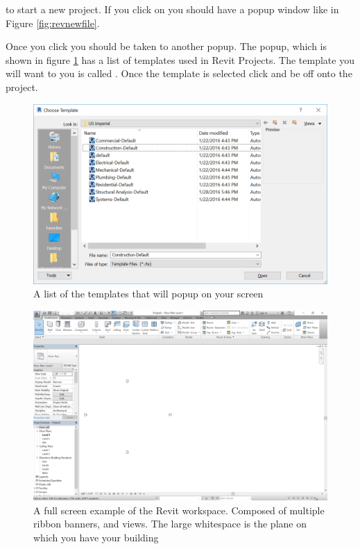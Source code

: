 \documentclass{tufte-book} %
\begin{document}
 to start a new project. If you click on  you should have a popup window like in Figure \ref{fig:revnewfile}. 

Once you click  you should be taken to another popup. The popup, which is shown in figure \ref{fig:revtmpview} has a list of templates used in Revit Projects. The template you will want to you is called . Once the template is selected click  and be off onto the project.


\begin{figure}
	\includegraphics[width=\linewidth]{revittemplateview.png}
	\caption{A list of the templates that will popup on your screen}
	\label{fig:revtmpview}
\end{figure}

\begin{figure}
	\includegraphics[width=\linewidth]{revitfullpageview.png}
	\caption{A full screen example of the Revit workspace. Composed of multiple ribbon banners, and views. The large whitespace is the plane on which you  have your building}
	\label{fig:revfullview}
\end{figure}
\end{document}
